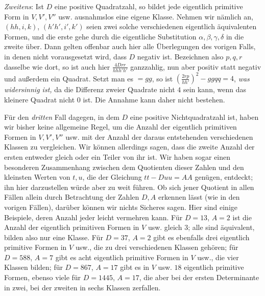 \textit{Zweitens}: Ist \(D\) eine positive Quadratzahl, so bildet jede eigentlich primitive Form in \(V,V',V''\) usw. ausnahmslos eine eigene Klasse. Nehmen wir nämlich an, \((hh,i,k)\), \((h'h',i',k')\) seien zwei solche verschiedenen eigentlich äquivalenten Formen, und die erste gehe durch die eigentliche Substitution \(\alpha,\beta,\gamma,\delta\) in die zweite über. Dann gelten offenbar auch hier alle Überlegungen des vorigen Falls, in denen nicht vorausgesetzt wird, dass \(D\) negativ ist. Bezeichnen also \(p,q,r\)
dasselbe wie dort, so ist auch hier \(\frac{4Drr}{hhh'h'}\) ganzzahlig, nun aber positiv statt negativ und außerdem ein Quadrat. Setzt man es \(=gg\), so ist \((\frac{2rp}{hh'})^2-ggqq=4\), \textit{was widersinnig ist,} da die Differenz zweier Quadrate nicht \(4\) sein kann, wenn das kleinere Quadrat nicht \(0\) ist. Die Annahme kann daher nicht bestehen.

Für den \textit{dritten} Fall dagegen, in dem \(D\) eine positive Nichtquadratzahl ist, haben wir bisher keine allgemeine Regel, um die Anzahl der eigentlich primitiven Formen in \(V,V',V''\) usw. mit der Anzahl der daraus entstehenden verschiedenen Klassen zu vergleichen. Wir können allerdings sagen, dass die zweite Anzahl der ersten entweder gleich oder ein Teiler von ihr ist. Wir haben sogar einen besonderen Zusammenhang zwischen dem Quotienten dieser Zahlen und den kleinsten Werten von \(t,u\), die der Gleichung \(tt-Duu=AA\) genügen, entdeckt; ihn hier darzustellen würde aber zu weit führen. Ob sich jener Quotient in allen Fällen allein durch Betrachtung der Zahlen \(D,A\) erkennen lässt (wie in den vorigen Fällen), darüber können wir nichts Sicheres sagen. Hier sind einige Beispiele, deren Anzahl jeder leicht vermehren kann. Für \(D=13\), \(A=2\) ist die Anzahl der eigentlich primitiven Formen in \(V\) usw. gleich \(3\); alle sind äquivalent, bilden also nur eine Klasse. Für \(D=37\), \(A=2\) gibt es ebenfalls drei eigentlich primitive Formen in \(V\) usw., die zu drei verschiedenen Klassen gehören; für \(D=588\), \(A=7\) gibt es acht eigentlich primitive Formen in \(V\) usw., die vier Klassen bilden; für \(D=867\), \(A=17\) gibt es in \(V\) usw. \(18\) eigentlich primitive Formen, ebenso viele für \(D=1445\), \(A=17\), die aber bei der ersten Determinante in zwei, bei der zweiten in sechs Klassen zerfallen.

